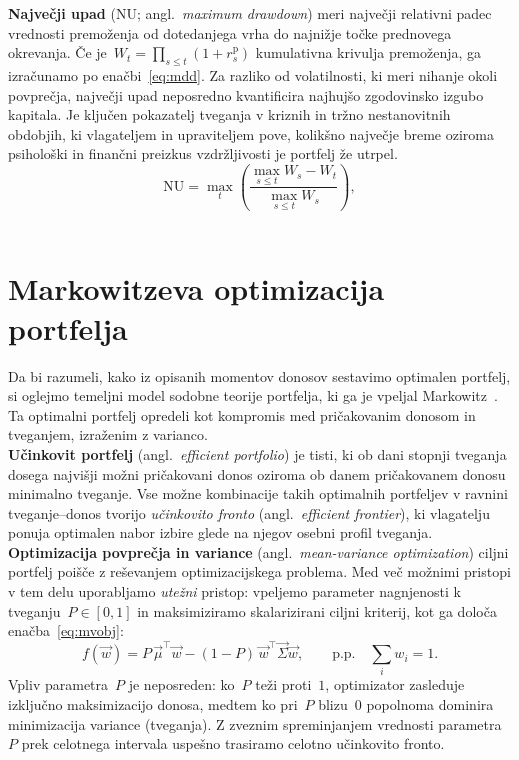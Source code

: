 \noindent\textbf{Največji upad} (NU; angl.\ \emph{maximum drawdown}) meri največji relativni padec vrednosti premoženja od dotedanjega vrha do najnižje točke prednovega okrevanja. Če je~$W_t = \prod_{s\le t}(1+r^{\text{p}}_s)$ kumulativna krivulja premoženja, ga izračunamo po enačbi~\eqref{eq:mdd}. Za razliko od volatilnosti, ki meri nihanje okoli povprečja, največji upad neposredno kvantificira najhujšo zgodovinsko izgubo kapitala. Je ključen pokazatelj tveganja v kriznih in tržno nestanovitnih obdobjih, ki vlagateljem in upraviteljem pove, kolikšno največje breme oziroma psihološki in finančni preizkus vzdržljivosti je portfelj že utrpel.
\begin{equation}
\label{eq:mdd}
  \mathrm{NU} = \max_t \left(\frac{\max_{s\le t} W_s - W_t}{\max_{s\le t} W_s}\right),
\end{equation}\\

\newpage

\section{Markowitzeva optimizacija portfelja}
\label{sec:markowitz}
Da bi razumeli, kako iz opisanih momentov donosov sestavimo optimalen portfelj, si oglejmo temeljni model sodobne teorije portfelja, ki ga je vpeljal Markowitz~\cite{markowitz1952}. Ta optimalni portfelj opredeli kot kompromis med pričakovanim donosom in tveganjem, izraženim z varianco.\\

\noindent\textbf{Učinkovit portfelj} (angl.\ \emph{efficient portfolio}) je tisti, ki ob dani stopnji tveganja dosega najvišji možni pričakovani donos oziroma ob danem pričakovanem donosu minimalno tveganje. Vse možne kombinacije takih optimalnih portfeljev v ravnini tveganje--donos tvorijo \emph{učinkovito fronto} (angl.\ \emph{efficient frontier}), ki vlagatelju ponuja optimalen nabor izbire glede na njegov osebni profil tveganja.\\

\noindent\textbf{Optimizacija povprečja in variance} (angl.\ \emph{mean-variance optimization}) ciljni portfelj poišče z reševanjem optimizacijskega problema. Med več možnimi pristopi v tem delu uporabljamo \emph{utežni} pristop: vpeljemo parameter nagnjenosti k tveganju~$P\in[0,1]$ in maksimiziramo skalarizirani ciljni kriterij, kot ga določa enačba~\eqref{eq:mvobj}:
\begin{equation}
\label{eq:mvobj}
  f(\vec{w}) = P\,\vec{\mu}^{\!\top}\vec{w} - (1-P)\,\vec{w}^{\!\top}\vec{\Sigma}\vec{w}, \qquad \text{p.p.}\quad \textstyle\sum_i w_i = 1.
\end{equation}
Vpliv parametra~$P$ je neposreden: ko~$P$ teži proti~$1$, optimizator zasleduje izključno maksimizacijo donosa, medtem ko pri~$P$ blizu~$0$ popolnoma dominira minimizacija variance (tveganja). Z zveznim spreminjanjem vrednosti parametra~$P$ prek celotnega intervala uspešno trasiramo celotno učinkovito fronto.\\

